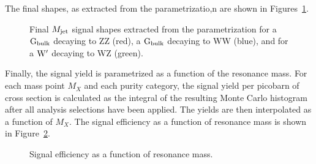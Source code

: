 The final \MJO shapes, as extracted from the parametrizatio,n are shown in Figures~\ref{fig:MJfromjson}.
\begin{figure}[h!]
\centering
{}
\caption{Final $M_{\rm jet}$ signal shapes extracted from the parametrization for a $\mathrm{G}_\mathrm{bulk}$ decaying to ZZ (red), a $\mathrm{G}_\mathrm{bulk}$ decaying to WW (blue), and for a $\mathrm{W}^\prime$ decaying to WZ (green).}
\label{fig:MJfromjson}
\end{figure}
Finally, the signal yield is parametrized as a function of the resonance mass. For each mass point $M_X$ and each purity category, the signal yield per picobarn of cross section is calculated as the integral of the resulting Monte Carlo histogram after all analysis selections have been applied.
The yields are then interpolated as a function of $M_X$. The signal efficiency as a function of resonance mass is shown in Figure~\ref{fig:SignalYields}.
\begin{figure}[h!]
\centering
{}
\caption{Signal efficiency as a function of resonance mass.}
\label{fig:SignalYields}
\end{figure}
\clearpage


